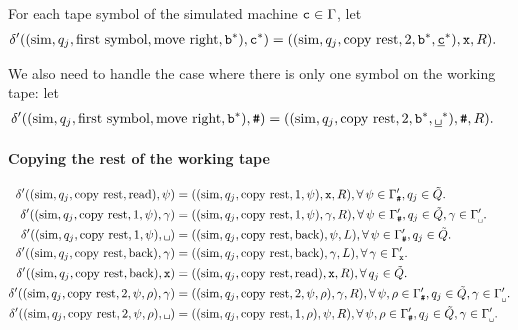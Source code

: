 For each tape symbol of the simulated machine $\texttt{c} \in \Gamma$,
let
\begin{align}
  \delta'((\text{sim}, q_j, \text{first symbol}, \text{move right}, \texttt{b}^*), \texttt{c}^*)
  &=
  ((\text{sim}, q_j, \text{copy rest}, 2, \texttt{b}^*, \underline{\texttt{c}}^*),\texttt{x},R).
\end{align}

We also need to handle the case where there is only one symbol on the working
tape:
let
\begin{align}
  \delta'((\text{sim}, q_j, \text{first symbol}, \text{move right}, \Q), \e)
  &=
  ((\text{sim}, q_j, \text{copy rest}, 2, \Q, \BB),\e,R).
\end{align}

\paragraph{Copying the rest of the working tape}

\begin{align}
  \delta'((\text{sim},q_j,\text{copy rest}, \text{read}), \psi)
  &= ((\text{sim},q_j, \text{copy rest},1, \psi), \X, R),
  \forall\,
  \psi \in\gpwe,
  q_j \in \qwar.\\
  \delta'((\text{sim}, q_j, \text{copy rest}, 1, \psi), \gamma)
  &= ((\text{sim}, q_j, \text{copy rest}, 1, \psi), \gamma, R),
  \forall\,
  \psi \in\gpwe,
  q_j \in \qwar,
  \gamma \in \gpwb.\\
  \delta'((\text{sim},q_j, \text{copy rest},1, \psi), \0{})
  &= ((\text{sim}, q_j, \text{copy rest}, \text{back}), \psi, L),
  \forall\,
  \psi \in\gpwe,
  q_j \in \qwar.\\
  \delta'((\text{sim}, q_j, \text{copy rest}, \text{back}), \gamma)
  &= ((\text{sim}, q_j, \text{copy rest}, \text{back}), \gamma, L),
  \forall\,\gamma \in \gpwx.\\
  \delta'((\text{sim}, q_j, \text{copy rest}, \text{back}), \X)
  &= ((\text{sim}, q_j, \text{copy rest}, \text{read}), \X, R),
  \forall\,
  q_j \in \qwar.\\
  \delta'((\text{sim}, q_j, \text{copy rest}, 2, \psi, \rho), \gamma)
  &= ((\text{sim}, q_j, \text{copy rest}, 2, \psi, \rho), \gamma, R),
  \forall\,
  \psi,\rho \in \gpwe,
  q_j \in \qwar,
  \gamma \in \gpwb.\\
  \delta'((\text{sim}, q_j, \text{copy rest}, 2, \psi, \rho), \0{})
  &= ((\text{sim}, q_j, \text{copy rest}, 1, \rho), \psi, R),
  \forall\,
  \psi,\rho \in \gpwe,
  q_j \in \qwar,
  \gamma \in\gpwb.
\end{align}


